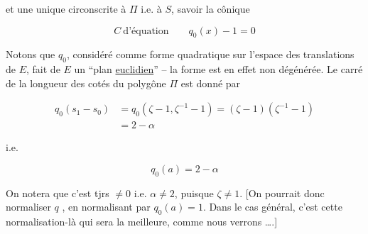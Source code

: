 
et une unique   circonscrite à $\Pi$ i.e. à $S$, savoir la cônique

\[C\ \text{d'équation}\qquad q_{0}(x)-1=0\]

Notons que $q_0$, considéré comme forme quadratique sur l'espace des translations de $E$, fait de $E$ un ``plan \uline{euclidien}'' -- la forme est en effet non dégénérée. Le carré de la longueur des cotés du polygône $\Pi$ est donné par

\[\begin{aligned}
q_0(s_1-s_0)&=q_0(\zeta-1,\zeta^{-1}-1)=(\zeta-1)(\zeta^{-1}-1)\\
&=2-\alpha
\end{aligned}\]

i.e.

\[q_0(a)=2-\alpha\]

On notera que c'est tjrs $\ne0$ i.e.  $\alpha\ne2$, puisque $\zeta\ne1$. [On pourrait donc normaliser  $q$ , en normalisant par $q_0(a)=1$. Dans le cas général, c'est cette normalisation-là qui sera la meilleure, comme nous verrons \dots.]


